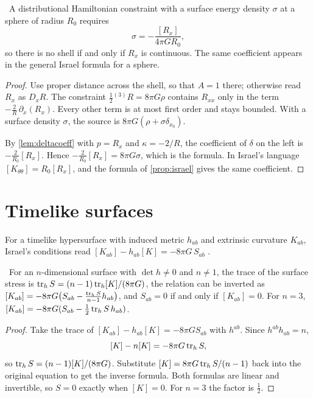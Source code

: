 \begin{proposition}\label{prop:sliceshell}\ver\
A distributional Hamiltonian constraint with a surface energy density $\sigma$ at a sphere of radius $R_0$ requires
\[
\sigma=-\frac{[R_x]}{4\pi GR_0},
\]
so there is no shell if and only if $R_x$ is continuous. The same coefficient appears in the general Israel formula for a sphere.
\end{proposition}
\begin{proof}
Use proper distance across the shell, so that $A=1$ there; otherwise read $R_x$ as $D_xR$. The constraint $\frac12{}^{(3)}R=8\pi G\rho$ contains $R_{xx}$ only in the term $-\frac2R\,\partial_x(R_x)$. Every other term is at most first order and stays bounded. With a surface density $\sigma$, the source is $8\pi G(\rho+\sigma\delta_{x_0})$.

By \cref{lem:deltacoeff} with $p=R_x$ and $\kappa=-2/R$, the coefficient of $\delta$ on the left is $-\frac2{R_0}[R_x]$. Hence $-\frac2{R_0}[R_x]=8\pi G\sigma$, which is the formula. In Israel's language $[K_{\theta\theta}]=R_0[R_x]$, and the formula of \cref{prop:israel} gives the same coefficient.
\end{proof}


\section{Timelike surfaces}

For a timelike hypersurface with induced metric $h_{ab}$ and extrinsic curvature $K_{ab}$, Israel's conditions read $[K_{ab}]-h_{ab}[K]=-8\pi G\,S_{ab}$ \cite{Israel1966,PoissonToolkit}.

\begin{proposition}[Israel's conditions, inverted]\label{prop:israel}\ver\
For an $n$-dimensional surface with $\det h\ne0$ and $n\ne1$, the trace of the surface stress is $\operatorname{tr}_hS=(n-1)\operatorname{tr}_h[K]/(8\pi G)$, the relation can be inverted as $[K_{ab}]=-8\pi G\bigl(S_{ab}-\frac{\operatorname{tr}_hS}{n-1}h_{ab}\bigr)$, and $S_{ab}=0$ if and only if $[K_{ab}]=0$. For $n=3$, $[K_{ab}]=-8\pi G(S_{ab}-\frac12\operatorname{tr}_hS\,h_{ab})$.
\end{proposition}
\begin{proof}
Take the trace of $[K_{ab}]-h_{ab}[K]=-8\pi GS_{ab}$ with $h^{ab}$. Since $h^{ab}h_{ab}=n$,
\[
[K]-n[K]=-8\pi G\operatorname{tr}_hS ,
\]
so $\operatorname{tr}_hS=(n-1)[K]/(8\pi G)$. Substitute $[K]=8\pi G\operatorname{tr}_hS/(n-1)$ back into the original equation to get the inverse formula. Both formulas are linear and invertible, so $S=0$ exactly when $[K]=0$. For $n=3$ the factor is $\frac12$.
\end{proof}


